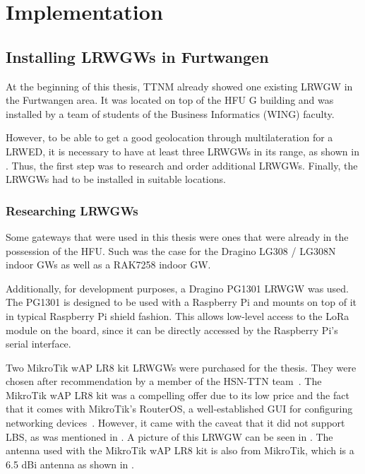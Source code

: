\chapter{Implementation}

\section{Installing \aclp{LRWGW} in Furtwangen}

At the beginning of this thesis, \ac{TTNM} already showed one existing \acl{LRWGW} in the Furtwangen area.
It was located on top of the \ac{HFU} G building and was installed by a team of students of the Business Informatics (WING) faculty.

However, to be able to get a good geolocation through multilateration for a \acl{LRWED}, it is necessary to have at least three \aclp{LRWGW} in its range, as shown in .
Thus, the first step was to research and order additional \aclp{LRWGW}.
Finally, the \aclp{LRWGW} had to be installed in suitable locations.

\subsection{Researching \aclp{LRWGW}}

Some gateways that were used in this thesis were ones that were already in the possession of the \ac{HFU}.
Such was the case for the Dragino LG308 / LG308N indoor \aclp{GW} as well as a RAK7258 indoor \acl{GW}.

Additionally, for development purposes, a Dragino PG1301 \acl{LRWGW} was used.
The PG1301 is designed to be used with a Raspberry Pi and mounts on top of it in typical Raspberry Pi shield fashion.
This allows low-level access to the \ac{LoRa} module on the board, since it can be directly accessed by the Raspberry Pi's serial interface.

Two MikroTik wAP LR8 kit \aclp{LRWGW} were purchased for the thesis.
They were chosen after recommendation by a member of the \ac{HSN-TTN} team~\cite{hochschwarzwald_smart_net_-_thethingsnetwork_eingesetzte_nodate}.
The MikroTik wAP LR8 kit was a compelling offer due to its low price and the fact that it comes with MikroTik's RouterOS, a well-established \ac{GUI} for configuring networking devices~\cite{mikrotik_mikrotik_nodate}.
However, it came with the caveat that it did not support \ac{LBS}, as was mentioned in .
A picture of this \acl{LRWGW} can be seen in .
The antenna used with the MikroTik wAP LR8 kit is also from MikroTik, which is a 6.5 dBi antenna as shown in .

